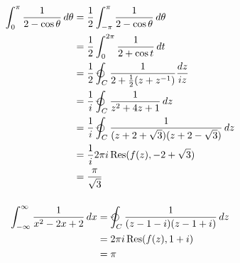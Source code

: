 \documentclass{article}
\newcommand{\Res}{\operatorname{Res}}
\begin{document}
\setcounter{subsubsection}{4}
\subsubsection{}

\begin{align*}
  \int_0^\pi \frac{1}{2 - \cos \theta} \,d \theta & = \frac{1}{2} \int_{-\pi}^\pi \frac{1}{2 - \cos \theta} \,d \theta                          \\
                                                  & = \frac{1}{2} \int_0^{2 \pi} \frac{1}{2 + \cos t} \,d t                                     \\
                                                  & = \frac{1}{2} \varointctrclockwise_C \frac{1}{2 + \frac{1}{2} (z + z^{-1})} \frac{d z}{i z} \\
                                                  & = \frac{1}{i} \varointctrclockwise_C \frac{1}{z^2 + 4 z + 1} \,d z                          \\
                                                  & = \frac{1}{i} \varointctrclockwise_C \frac{1}{(z + 2 + \sqrt{3}) (z + 2 - \sqrt{3})} \,d z  \\
                                                  & = \frac{1}{i} 2 \pi i \Res(f(z), -2 + \sqrt{3})                                             \\
                                                  & = \frac{\pi}{\sqrt{3}}
\end{align*}

\setcounter{subsubsection}{10}
\subsubsection{}

\begin{align*}
  \int_{-\infty}^\infty \frac{1}{x^2 - 2 x + 2} \,d x & = \varointctrclockwise_C \frac{1}{(z - 1 - i) (z - 1 + i)} \,d z \\
                                                      & = 2 \pi i \Res(f(z), 1 + i)                                      \\
                                                      & = \pi
\end{align*}

\setcounter{subsubsection}{12}
\subsubsection{}
\end{document}
